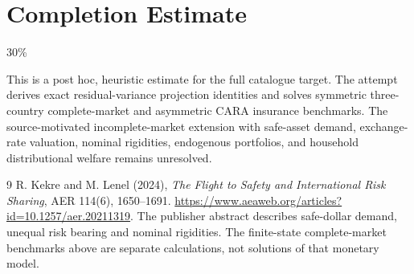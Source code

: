 \documentclass[11pt]{article}
\theoremstyle{definition}
\begin{document}
\section{Completion Estimate}
30\%

This is a post hoc, heuristic estimate for the full catalogue target.
The attempt derives exact residual-variance projection identities and solves symmetric three-country complete-market and asymmetric CARA insurance benchmarks. The source-motivated incomplete-market extension with safe-asset demand, exchange-rate valuation, nominal rigidities, endogenous portfolios, and household distributional welfare remains unresolved.

\begin{thebibliography}{9}
 R. Kekre and M. Lenel (2024),
\emph{The Flight to Safety and International Risk Sharing}, AER 114(6), 1650--1691.
\url{https://www.aeaweb.org/articles?id=10.1257/aer.20211319}.
The publisher abstract describes safe-dollar demand, unequal risk bearing and
nominal rigidities. The finite-state complete-market benchmarks above are
separate calculations, not solutions of that monetary model.
\end{thebibliography}
\end{document}
